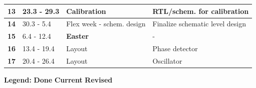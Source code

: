 \documentclass[t, screen, aspectratio=43]{beamer}
\begin{document}
\begin{frame}
\begin{table}[htb!]
\begin{tabular}{|c|l|l|l|}
			\hline 
			\rule[-1ex]{0pt}{2.5ex}\textbf{13}&23.3 - 29.3& Calibration& RTL/schem. for calibration\\ 
			\hline 
			\rule[-1ex]{0pt}{2.5ex}\textbf{14}& 30.3 - 5.4 &  Flex week - schem. design & Finalize schematic level design\\ 
			\hline 
			\rule[-1ex]{0pt}{2.5ex}\textbf{15}& 6.4 - 12.4& {\color{red}\textbf{Easter}} & - \\ 
			\hline 
			\rule[-1ex]{0pt}{2.5ex}\textbf{16}& 13.4 - 19.4& Layout & Phase detector\\ 
			\hline 
			\rule[-1ex]{0pt}{2.5ex}\textbf{17}& 20.4 - 26.4& Layout & Oscillator\\ 
			\hline 
		\end{tabular}
		\begin{flushleft}\textbf{Legend:} \colorbox{red!20}{\textbf{Done}} \colorbox{green!20}{\textbf{Current}}  \colorbox{blue!20}{\textbf{Revised}}
		\end{flushleft}
	\end{table}   
\end{frame}
\end{document}
